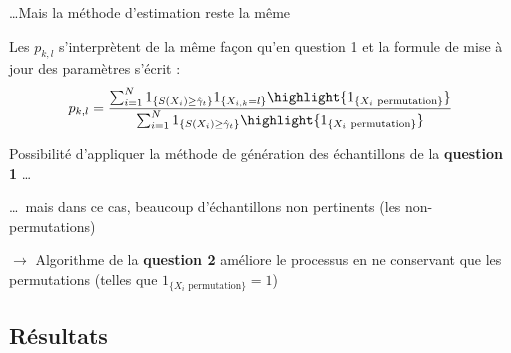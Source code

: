 \documentclass[10pt,xcolor=table,color={dvipsnames,usenames},ignorenonframetext,usepdftitle=false,french]{beamer}
\begin{document}
\begin{frame}{\dots Mais la méthode d'estimation reste la même}
\protect\hypertarget{mais-la-muxe9thode-destimation-reste-la-muxeame}{}

Les \(p_{k,l}\) s'interprètent de la même façon qu'en question 1 et la
formule de mise à jour des paramètres s'écrit : \[p_{k,l}=\frac{
\sum_{i=1}^{N}1_{\{S(X_{i})\geq\hat{\gamma}_{t}\}}1_{\left\{ X_{i,k}=l\right\} }
\highlight{1_{\{X_{i}\text{ permutation}\}}}
}{
\sum_{i=1}^{N}1_{\{S(X_{i})\geq\hat{\gamma}_{t}\}}
\highlight{1_{\{X_{i}\text{ permutation}\}}}
}\]

\pause

Possibilité d'appliquer la méthode de génération des échantillons de la
\textbf{question 1} \dots

\pause

\dots ~mais dans ce cas, beaucoup d'échantillons non pertinents (les
non-permutations)

\pause

\(\longrightarrow\) Algorithme de la \textbf{question 2} améliore le
processus en ne conservant que les permutations (telles que
\(1_{\{X_{i}\text{ permutation}\}} = 1\))

\end{frame}

\hypertarget{ruxe9sultats-1}{%
\subsection{Résultats}\label{ruxe9sultats-1}}
\end{document}
